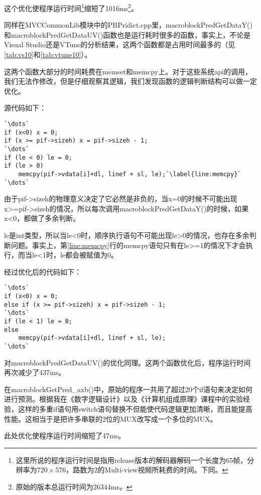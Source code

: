 这个优化使程序运行时间\footnote{这里所说的程序运行时间是指用release版本的解码器解码一个长度为65帧，分辨率为$720\times576$，路数为2的Multi-view视频所耗费的时间。下同。}缩短了1016ms\footnote{原始的版本总运行时间为26344ms。}。

同样在MVCCommonLib模块中的PBPridict.cpp里，macroblockPredGetDataY()和macroblockPredGetDataUV()函数也是运行耗时很多的函数，事实上，不论是Visual Studio还是VTune的分析结果，这两个函数都是占用时间最多的（见\autoref{tab:vs10}和\autoref{tab:vtune10}）。

这两个函数大部分的时间耗费在memset和memcpy上。对于这些系统api的调用，我们无法作修改，但是仔细观察其逻辑，我们发现函数的逻辑判断结构可以做一定优化。

源代码如下：

\begin{lstlisting}[caption = {macroblockPredGetDataY()函数片段（优化前）}, label = lst:macroblockPredGetDataYorig]
`\dots`
if (x<0) x = 0;
if (x >= pif->sizeh) x = pif->sizeh - 1;
`\dots`
if (le < 0) le = 0;
if (le > 0)
	memcpy(pif->vdata[i]+dl, linef + sl, le);`\label{line:memcpy}`
`\dots`
\end{lstlisting}

由于pif->sizeh的物理意义决定了它必然是非负的，当x=0的时候不可能出现x>=pif->sizeh的情况，所以每次调用macroblockPredGetDataY()的时候，如果x<0，都做了多余判断。

le是int类型，所以当le<0时，顺序执行语句不可能出现le>0的情况，也存在多余判断问题。事实上，第\ref{line:memcpy}行的memcpy语句只有在le>=1的情况下才会执行，而当le<1时，le都会被赋值为0。

经过优化后的代码如下：

\begin{lstlisting}[caption = {macroblockPredGetDataY()函数片段（优化后）}, label = lst:macroblockPredGetDataYopt]
`\dots`
if (x<0) x = 0;
else if (x >= pif->sizeh) x = pif->sizeh - 1;
`\dots`
if (le < 1) le = 0;
else
	memcpy(pif->vdata[i]+dl, linef + sl, le);
`\dots`
\end{lstlisting}

对macroblockPredGetDataUV()的优化同理。这两个函数优化后，程序运行时间再次减少了437ms。

在macroblockGetPred\_axb()中，原始的程序一共用了超过20个if语句来决定如何进行预测。根据我在《数字逻辑设计》以及《计算机组成原理》课程中的实验经验，这样的多重if语句用switch语句替换不但能使代码逻辑更加清晰，而且能提高性能。这相当于是把许多串联的2位的MUX改写成一个多位的MUX。

此处优化使程序运行时间缩短了47ms。

